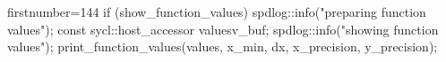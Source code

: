 \begin{cppcode*}{firstnumber=144}
        if (show_function_values) {
          spdlog::info("preparing function values");
          const sycl::host_accessor values{v_buf};
          spdlog::info("showing function values");
          print_function_values(values, x_min, dx, 
            x_precision, y_precision);
        }
\end{cppcode*}
